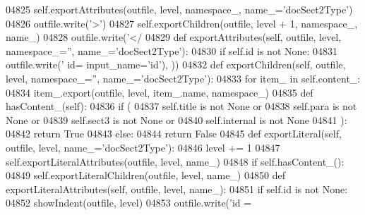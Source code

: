 \begin{DoxyCode}
{{{{{{{{{{{{{{{{{{{{{{{{{{{{{{{{{{{{{{{{{{{{{{{{{{{{{{{{{{{{{{{{{{{{{{{{{{{{{{{{{{{{{{{{{{{{{{{{{{{{{{{{{{{{{{{{{{{{{{{{{{{{{{{{{{{{{{{{{{{{{{{{{{{{{{{{{{{{{{{{{{{{{{{{{{{{{{{{{{{{{{{{{{{{{{{{{{{{{{{{{{{{{{{{{{{{{{{{{{{{{{{{{{{{{{{{{{{{{{{{{{{{{{{{{{{{{{{{{{{{{{{{{{{{{{{{{{{{{{{{{{{{{{{{{{{{{{{{{{{{{{{{{{{{{{{{{{{{{{{{{{{{{04825         self.exportAttributes(outfile, level, namespace\_, name\_=\textcolor{stringliteral}{'docSect2Type'})
04826         outfile.write(\textcolor{stringliteral}{'>'})
04827         self.exportChildren(outfile, level + 1, namespace\_, name\_)
04828         outfile.write(\textcolor{stringliteral}{'</%
04829     \textcolor{keyword}{def }exportAttributes(self, outfile, level, namespace\_='', name\_='docSect2Type'):
04830         \textcolor{keywordflow}{if} self.id \textcolor{keywordflow}{is} \textcolor{keywordflow}{not} \textcolor{keywordtype}{None}:
04831             outfile.write(\textcolor{stringliteral}{' id=%
      input\_name=\textcolor{stringliteral}{'id'}), ))
04832     \textcolor{keyword}{def }exportChildren(self, outfile, level, namespace\_='', name\_='docSect2Type'):
04833         \textcolor{keywordflow}{for} item\_ \textcolor{keywordflow}{in} self.content_:
04834             item\_.export(outfile, level, item\_.name, namespace\_)
04835     \textcolor{keyword}{def }hasContent_(self):
04836         \textcolor{keywordflow}{if} (
04837             self.title \textcolor{keywordflow}{is} \textcolor{keywordflow}{not} \textcolor{keywordtype}{None} \textcolor{keywordflow}{or}
04838             self.para \textcolor{keywordflow}{is} \textcolor{keywordflow}{not} \textcolor{keywordtype}{None} \textcolor{keywordflow}{or}
04839             self.sect3 \textcolor{keywordflow}{is} \textcolor{keywordflow}{not} \textcolor{keywordtype}{None} \textcolor{keywordflow}{or}
04840             self.internal \textcolor{keywordflow}{is} \textcolor{keywordflow}{not} \textcolor{keywordtype}{None}
04841             ):
04842             \textcolor{keywordflow}{return} \textcolor{keyword}{True}
04843         \textcolor{keywordflow}{else}:
04844             \textcolor{keywordflow}{return} \textcolor{keyword}{False}
04845     \textcolor{keyword}{def }exportLiteral(self, outfile, level, name\_='docSect2Type'):
04846         level += 1
04847         self.exportLiteralAttributes(outfile, level, name\_)
04848         \textcolor{keywordflow}{if} self.hasContent_():
04849             self.exportLiteralChildren(outfile, level, name\_)
04850     \textcolor{keyword}{def }exportLiteralAttributes(self, outfile, level, name\_):
04851         \textcolor{keywordflow}{if} self.id \textcolor{keywordflow}{is} \textcolor{keywordflow}{not} \textcolor{keywordtype}{None}:
04852             showIndent(outfile, level)
04853             outfile.write(\textcolor{stringliteral}{'id = %
}}}}}}}}}}}}}}}}}}}}}}}}}}}}}}}}}}}}}}}}}}}}}}}}}}}}}}}}}}}}}}}}}}}}}}}}}}}}}}}}}}}}}}}}}}}}}}}}}}}}}}}}}}}}}}}}}}}}}}}}}}}}}}}}}}}}}}}}}}}}}}}}}}}}}}}}}}}}}}}}}}}}}}}}}}}}}}}}}}}}}}}}}}}}}}}}}}}}}}}}}}}}}}}}}}}}}}}}}}}}}}}}}}}}}}}}}}}}}}}}}}}}}}}}}}}}}}}}}}}}}}}}}}}}}}}}}}}}}}}}}}}}}}}}}}}}}}}}}}}}}}}}}}}}}}}}}}}}}}}}}}}}}}}}
\end{DoxyCode}
